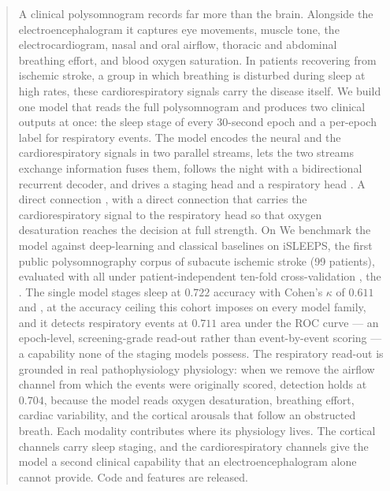 \documentclass[journal]{IEEEtran}
\newcommand{\mmAcc}{0.722}
\newcommand{\mmK}{0.611}
\newcommand{\mmAuc}{0.711}
\newcommand{\noflowAuc}{0.704}
\providecommand{\DIFaddtex}[1]{{\protect\color{blue} \sf #1}} %
\providecommand{\DIFdeltex}[1]{{\protect\color{red} \scriptsize #1}} %
\providecommand{\DIFaddbegin}{} %
\providecommand{\DIFaddend}{} %
\providecommand{\DIFdelbegin}{} %
\providecommand{\DIFdelend}{} %
\providecommand{\DIFadd}[1]{\texorpdfstring{\DIFaddtex{#1}}{#1}} %
\providecommand{\DIFdel}[1]{\texorpdfstring{\DIFdeltex{#1}}{}} %
\providecommand{\DIFscaledelfig}{0.5}
\newlength{\DIFdelgraphicswidth} %
\newlength{\DIFdelgraphicsheight} %
\providecommand{\DIFaddincludegraphics}[2][]{{\color{blue}\fbox{\DIFOincludegraphics[#1]{#2}}}} %
\providecommand{\DIFdelincludegraphics}[2][]{%
\sbox{\DIFdelgraphicsbox}{\DIFOincludegraphics[#1]{#2}}%
\settoboxwidth{\DIFdelgraphicswidth}{\DIFdelgraphicsbox} %
\settoboxtotalheight{\DIFdelgraphicsheight}{\DIFdelgraphicsbox} %
\scalebox{\DIFscaledelfig}{%
\parbox[b]{\DIFdelgraphicswidth}{\usebox{\DIFdelgraphicsbox}\\[-\baselineskip] \rule{\DIFdelgraphicswidth}{0em}}\llap{\resizebox{\DIFdelgraphicswidth}{\DIFdelgraphicsheight}{%
\setlength{\unitlength}{\DIFdelgraphicswidth}%
\begin{picture}(1,1)%
\thicklines\linethickness{2pt} %
{\color[rgb]{1,0,0}\put(0,0){\framebox(1,1){}}}%
{\color[rgb]{1,0,0}\put(0,0){\line( 1,1){1}}}%
{\color[rgb]{1,0,0}\put(0,1){\line(1,-1){1}}}%
\end{picture}%
}\hspace*{3pt}}} %
} %
\DeclareRobustCommand{\DIFaddbegin}{\DIFOaddbegin \let\includegraphics\DIFaddincludegraphics} %
\DeclareRobustCommand{\DIFaddend}{\DIFOaddend \let\includegraphics\DIFOincludegraphics} %
\DeclareRobustCommand{\DIFdelbegin}{\DIFOdelbegin \let\includegraphics\DIFdelincludegraphics} %
\DeclareRobustCommand{\DIFdelend}{\DIFOaddend \let\includegraphics\DIFOincludegraphics} %
\begin{document}
\DIFaddend \begin{abstract}
A clinical polysomnogram records far more than the brain. Alongside the
electroencephalogram it captures eye movements, muscle tone, the electrocardiogram,
nasal and oral airflow, thoracic and abdominal breathing effort, and blood oxygen
saturation. In patients recovering from ischemic stroke, a group in which breathing is
disturbed during sleep at high rates, these cardiorespiratory signals carry the disease
itself. We build one model that reads the full polysomnogram and produces two clinical
outputs at once: the sleep stage of every 30-second epoch and a per-epoch label for
respiratory events. The model encodes the neural and the cardiorespiratory signals in two
parallel streams, \DIFdelbegin \DIFdel{lets the two streams exchange information}\DIFdelend \DIFaddbegin \DIFadd{fuses them}\DIFaddend , follows the night with a bidirectional recurrent decoder, and
drives a staging head and a respiratory head\DIFdelbegin \DIFdel{. A
direct connection }\DIFdelend \DIFaddbegin \DIFadd{, with a direct connection that }\DIFaddend carries the
cardiorespiratory signal to the respiratory head so \DIFdelbegin \DIFdel{that
}\DIFdelend oxygen desaturation reaches the decision at
full strength. \DIFdelbegin \DIFdel{On }\DIFdelend \DIFaddbegin \DIFadd{We benchmark
the model against deep-learning and classical baselines on }\DIFaddend iSLEEPS, the first public
polysomnography corpus of subacute ischemic stroke (99 patients), \DIFdelbegin \DIFdel{evaluated with
}\DIFdelend \DIFaddbegin \DIFadd{all under }\DIFaddend patient-independent ten-fold
cross-validation\DIFdelbegin \DIFdel{, the }\DIFdelend \DIFaddbegin \DIFadd{. The }\DIFaddend single model stages sleep at $\mmAcc$ accuracy with Cohen's $\kappa$
of $\mmK$\DIFdelbegin \DIFdel{and }\DIFdelend \DIFaddbegin \DIFadd{, at the accuracy ceiling this cohort imposes on every model family, and it }\DIFaddend detects
respiratory events at $\mmAuc$ area under the ROC curve \DIFaddbegin \DIFadd{--- an epoch-level, screening-grade
read-out rather than event-by-event scoring --- a capability none of the staging models
possess}\DIFaddend . The respiratory read-out is grounded in \DIFdelbegin \DIFdel{real pathophysiology}\DIFdelend \DIFaddbegin \DIFadd{physiology}\DIFaddend : when we remove the
airflow channel from which the events were \DIFdelbegin \DIFdel{originally }\DIFdelend scored, detection holds at $\noflowAuc$, because
the model reads oxygen desaturation, breathing effort, cardiac variability, and the cortical
arousals that follow an obstructed breath. Each modality contributes where its physiology
lives. \DIFdelbegin \DIFdel{The cortical channels carry sleep staging, and the
cardiorespiratory channels give the model a second clinical capability that an
electroencephalogram alone cannot provide. }\DIFdelend Code and features are released.
\end{abstract}
\end{document}
